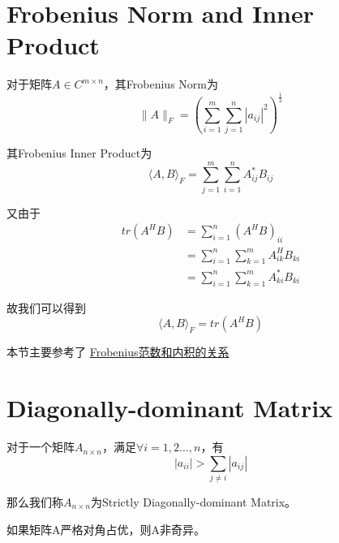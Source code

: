 \documentclass[lang=cn,10pt]{elegantbook}
\begin{document}
\section{Frobenius Norm and Inner Product}
\begin{definition}
	对于矩阵$A \in C^{m \times n}$，其Frobenius Norm为
	\begin{equation}
		\|A\|_F = \left(\sum_{i=1}^m \sum_{j=1}^n |a_{ij}|^2\right)^{\frac{1}{2}}
	\end{equation}
	\par 其Frobenius Inner Product为
	\begin{equation}
		\langle A,B \rangle_F = \sum_{j=1}^m\sum_{i=1}^nA_{ij}^*B_{ij}
	\end{equation}
\end{definition}
又由于
\begin{equation*}
	\begin{aligned}
		tr(A^HB) & =\sum_{i=1}^n(A^HB)_{ii}                \\
		         & =\sum_{i=1}^n\sum_{k=1}^mA_{ik}^HB_{ki} \\
		         & =\sum_{i=1}^n\sum_{k=1}^mA_{ki}^*B_{ki}
	\end{aligned}
\end{equation*}

故我们可以得到
\begin{equation*}
	\langle A,B \rangle_F = tr(A^HB)
\end{equation*}

\par 本节主要参考了
\href{https://zhuanlan.zhihu.com/p/619586436}{Frobenius范数和内积的关系}

\section{Diagonally-dominant Matrix}
\begin{definition}
	对于一个矩阵$A_{n \times n}$，满足$\forall i = 1,2\ldots,n$，有
	\begin{equation}
		|a_{ii}|>\sum_{j\neq i}|a_{ij}|
	\end{equation}
	\par 那么我们称$A_{n \times n}$为Strictly Diagonally-dominant Matrix。
\end{definition}

\begin{theorem}
	如果矩阵A严格对角占优，则A非奇异。
\end{theorem}
\end{document}
